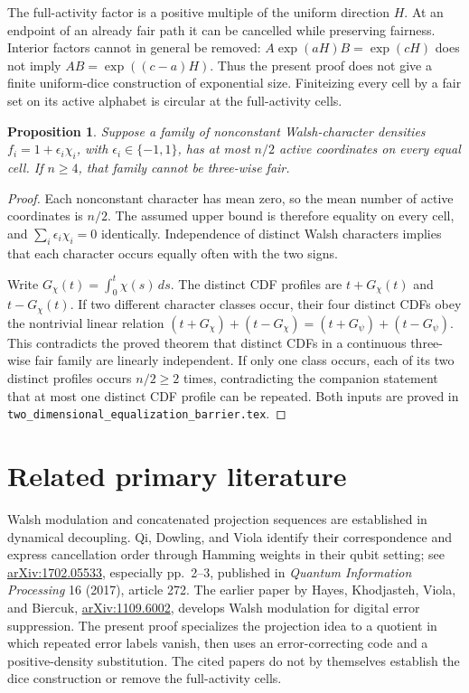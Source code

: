 \documentclass[11pt]{article}
\newtheorem{proposition}[theorem]{Proposition}
\begin{document}
The full-activity factor is a positive multiple of the uniform direction
$H$. At an endpoint of an already fair path it can be cancelled while
preserving fairness. Interior factors cannot in general be removed:
$A\exp(aH)B=\exp(cH)$ does not imply $AB=\exp((c-a)H)$.
Thus the present proof does not give a finite uniform-dice construction
of exponential size. Finiteizing every cell by a fair set on its active
alphabet is circular at the full-activity cells.

\begin{proposition}\label{half}
Suppose a family of nonconstant Walsh-character densities
$f_i=1+\epsilon_i\chi_i$, with $\epsilon_i\in\{-1,1\}$, has at most
$n/2$ active coordinates on every equal cell. If $n\ge4$, that family
cannot be three-wise fair.
\end{proposition}
\begin{proof}
Each nonconstant character has mean zero, so the mean number of active
coordinates is $n/2$. The assumed upper bound is therefore equality
on every cell, and $\sum_i\epsilon_i\chi_i=0$ identically. Independence
of distinct Walsh characters implies that each character occurs equally
often with the two signs.

Write $G_\chi(t)=\int_0^t\chi(s)\,ds$. The distinct CDF profiles are
$t+G_\chi(t)$ and $t-G_\chi(t)$. If two different character classes
occur, their four distinct CDFs obey the nontrivial linear relation
$(t+G_\chi)+(t-G_\chi)=(t+G_\psi)+(t-G_\psi)$. This contradicts the
proved theorem that distinct CDFs in a continuous three-wise fair family
are linearly independent. If only one class occurs, each of its two
distinct profiles occurs $n/2\ge2$ times, contradicting the companion
statement that at most one distinct CDF profile can be repeated.
Both inputs are proved in
\texttt{two\_dimensional\_equalization\_barrier.tex}.
\end{proof}
\section*{Related primary literature}
Walsh modulation and concatenated projection sequences are established
in dynamical decoupling. Qi, Dowling, and Viola identify their
correspondence and express cancellation order through Hamming weights
in their qubit setting; see
\href{https://arxiv.org/abs/1702.05533}{arXiv:1702.05533}, especially
pp.~2--3, published in \emph{Quantum Information Processing} 16 (2017),
article 272. The earlier paper by Hayes, Khodjasteh, Viola, and Biercuk,
\href{https://arxiv.org/abs/1109.6002}{arXiv:1109.6002}, develops Walsh
modulation for digital error suppression. The present proof specializes
the projection idea to a quotient in which repeated error labels vanish,
then uses an error-correcting code and a positive-density substitution.
The cited papers do not by themselves establish the dice construction
or remove the full-activity cells.
\end{document}
